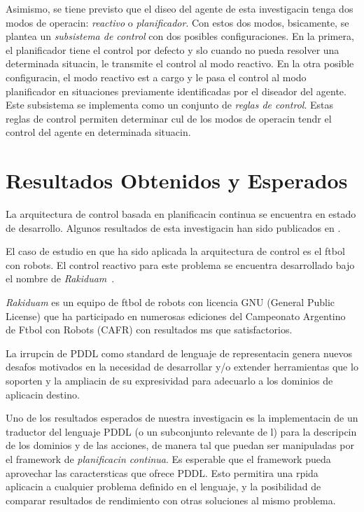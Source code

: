 \documentclass[a4paper,12pt,twocolumn]{article}
\begin{document}
Asimismo, se tiene previsto que el diseo del agente de esta investigacin
tenga dos mo\-dos de operacin: \emph{reactivo} o \emph{planificador}. Con estos dos
modos, bsicamente, se plantea un \emph{subsistema de control} con dos
posibles configuraciones. En la primera, el planificador tiene el control por
defecto y slo cuando no pueda resolver una determinada situacin, le transmite el control
al modo reactivo. En la otra posible configuracin, el modo reactivo est a cargo
y le pasa el control al modo planificador en situaciones
previamente identificadas por el diseador del agente. Este subsistema
se implementa como un conjunto de \emph{reglas de control}.  Estas
reglas de control permiten determinar cul de los modos de
operacin tendr el control del agente en determinada situacin.


\section{Resultados Obtenidos y Esperados}
\label{sec:result-obten}

La arquitectura de control basada en pla\-ni\-fi\-ca\-cin continua se
encuentra en estado de desarrollo. Algunos resultados de esta
investigacin han sido publicados en
\cite{moya09:_agent_delib_basad_en_contin,mkpcv10:smad_p}.
 
El caso de estudio en que ha sido aplicada la arquitectura de control es el
ftbol con robots. El control reactivo para este problema se encuentra
desarrollado bajo el nombre de
\emph{Ra\-ki\-duam}~\cite{kogan07:_rakid,moya08:_framew_para_el_desar_de}.

\emph{Rakiduam} es un
equipo de ftbol de robots con licencia GNU (General
Public License) que ha participado en numerosas
ediciones del Campeonato Argentino de Ftbol con Robots (CAFR) 
con resultados ms que 
satisfactorios\cite{kogan06:_aspec_de_y_de_del,kogan07:_rakid,mtk08:fdefr,trevisani09:_rakid}.


La irrupcin de PDDL como standard de lenguaje de representacin genera nuevos desafos motivados en la necesidad de 
desarrollar y/o extender herramientas que lo soporten y la ampliacin de su expresividad para adecuarlo a los 
dominios de aplicacin destino.


Uno de los resultados esperados de nuestra investigacin es la 
implementacin de un traductor del lenguaje PDDL (o un subconjunto relevante de l)
para la
descripcin de los dominios y de las acciones, de manera tal que puedan
ser manipuladas por el framework
de \emph{planificacin continua}\cite{moya09:_agent_delib_basad_en_contin}.
Es esperable que el framework
pueda aprovechar las caractersticas que ofrece PDDL. Esto permitira
una rpida aplicacin a cualquier problema definido en el lenguaje, y la posibilidad
de comparar resultados de rendimiento con otras soluciones al mismo problema.
\end{document}
